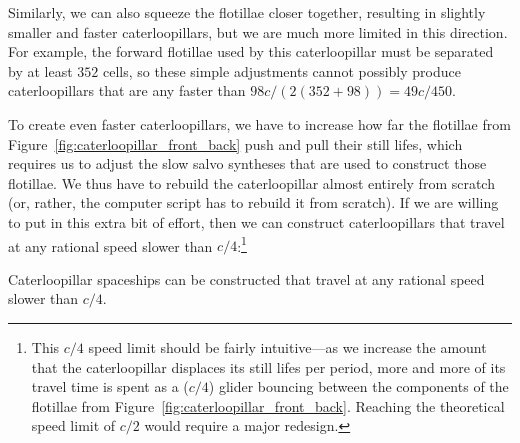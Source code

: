 Similarly, we can also squeeze the flotillae closer together, resulting in slightly smaller and faster caterloopillars, but we are much more limited in this direction. For example, the forward flotillae used by this caterloopillar must be separated by at least $352$ cells, so these simple adjustments cannot possibly produce caterloopillars that are any faster than $98c/(2(352 + 98)) = 49c/450$.

To create even faster caterloopillars, we have to increase how far the flotillae from Figure~\ref{fig:caterloopillar_front_back} push and pull their still lifes, which requires us to adjust the slow salvo syntheses that are used to construct those flotillae. We thus have to rebuild the caterloopillar almost entirely from scratch (or, rather, the computer script has to rebuild it from scratch). If we are willing to put in this extra bit of effort, then we can construct caterloopillars that travel at any rational speed slower than $c/4$:\footnote{This $c/4$ speed limit should be fairly intuitive---as we increase the amount that the caterloopillar displaces its still lifes per period, more and more of its travel time is spent as a ($c/4$) glider bouncing between the components of the flotillae from Figure~\ref{fig:caterloopillar_front_back}. Reaching the theoretical speed limit of $c/2$ would require a major redesign.}

\begin{theorem}\label{thm:caterloopillar_speeds}
	Caterloopillar spaceships can be constructed that travel at any rational speed slower than $c/4$.
\end{theorem}

